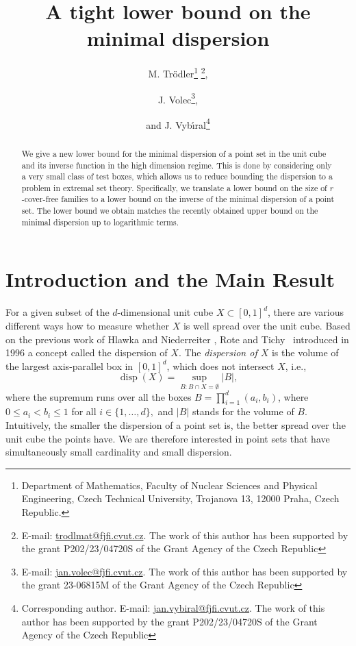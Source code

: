 \documentclass[11pt]{article}
\DeclareMathOperator\disp{disp}
\begin{document}
\title{A tight lower bound on the minimal dispersion}

\author{M. Tr\"odler\thanks{Department of Mathematics, Faculty of Nuclear Sciences and Physical Engineering,
Czech Technical University, Trojanova 13, 12000 Praha, Czech Republic.}
\thanks{E-mail: \href{mailto:trodlmat@fjfi.cvut.cz}{trodlmat@fjfi.cvut.cz}.
The work of this author has been supported by the grant P202/23/04720S of the Grant Agency of the Czech Republic},
\and J. Volec\footnotemark[1]
\thanks{E-mail: \href{mailto:jan.volec@fjfi.cvut.cz}{jan.volec@fjfi.cvut.cz}.
The work of this author has been supported by the grant 23-06815M of the Grant Agency of the Czech Republic},
\and and J. Vyb\'\i ral\footnotemark[1]
\thanks{Corresponding author. E-mail: \href{mailto:jan.vybiral@fjfi.cvut.cz}{jan.vybiral@fjfi.cvut.cz}.
The work of this author has been supported by the grant P202/23/04720S of the Grant Agency of the Czech Republic}
}
\date{}
\maketitle
\begin{abstract}
We give a new lower bound for the minimal dispersion of a point set in the unit cube and its inverse function in the high dimension regime.
This is done by considering only a very small class of test boxes, which allows us to reduce bounding the dispersion to a problem in extremal set theory.
Specifically, we translate a lower bound on the size of $r$-cover-free families
to a lower bound on the inverse of the minimal dispersion of a point set.
The lower bound we obtain matches the recently obtained upper bound on the minimal dispersion up to logarithmic terms.
\end{abstract}


\section{Introduction and the Main Result}

For a given subset of the $d$-dimensional unit cube $X\subset [0,1]^d$, there are various different ways how to measure whether $X$ is well spread over the unit cube.
Based on the previous work of Hlawka \cite{Hlawka} and Niederreiter \cite{Nieder}, Rote and Tichy~\cite{RT96} introduced in 1996 a concept called the dispersion of $X$.
The \emph{dispersion of $X$} is the volume of the largest axis-parallel box in $[0,1]^d$, which does not intersect $X$, i.e.,
\[
\disp(X)=\sup_{B:B\cap X=\emptyset} |B|,
\]
where the supremum runs over all the boxes $B=\prod_{i=1}^d (a_i,b_i)$, where $0\le a_i<b_i\le 1$ for all $i\in\{1,\dots,d\},$ and $|B|$ stands for the volume of $B$.
Intuitively, the smaller the dispersion of a point set is, the better spread over the unit cube the points have.
We are therefore interested in point sets that have simultaneously small cardinality and small dispersion.
\end{document}
